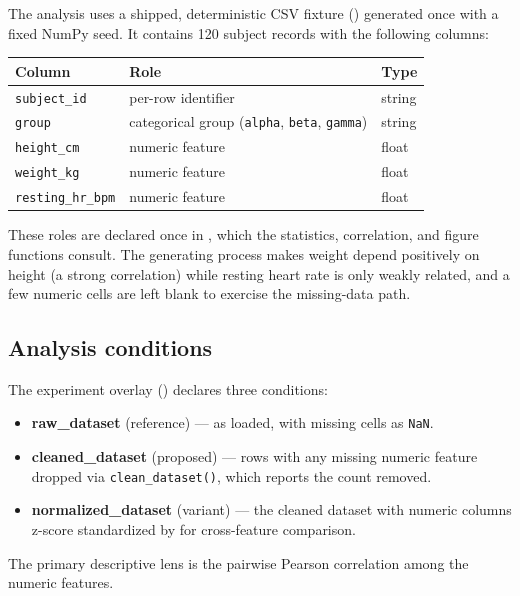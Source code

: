 \documentclass[
  english,
]{article}
\newcounter{none} %
\providecommand{\tightlist}{%
  \setlength{\itemsep}{0pt}\setlength{\parskip}{0pt}}
\begin{document}
The analysis uses a shipped, deterministic CSV fixture
() generated once with a fixed NumPy seed.
It contains 120 subject records with the following columns:

{\def\LTcaptype{none} %
\begin{longtable}[]{@{}lll@{}}
\toprule\noalign{}
Column & Role & Type \\
\midrule\noalign{}
\endhead
\bottomrule\noalign{}
\endlastfoot
\texttt{subject\_id} & per-row identifier & string \\
\texttt{group} & categorical group (\texttt{alpha}, \texttt{beta},
\texttt{gamma}) & string \\
\texttt{height\_cm} & numeric feature & float \\
\texttt{weight\_kg} & numeric feature & float \\
\texttt{resting\_hr\_bpm} & numeric feature & float \\
\end{longtable}
}

These roles are declared once in
, which the statistics,
correlation, and figure functions consult. The generating process makes
weight depend positively on height (a strong correlation) while resting
heart rate is only weakly related, and a few numeric cells are left
blank to exercise the missing-data path.

\subsection{Analysis conditions}\label{analysis-conditions}

The experiment overlay () declares three
conditions:

\begin{itemize}
\tightlist
\item
  \textbf{raw\_dataset} (reference) --- as loaded, with missing cells as
  \texttt{NaN}.
\item
  \textbf{cleaned\_dataset} (proposed) --- rows with any missing numeric
  feature dropped via \texttt{clean\_dataset()}, which reports the count
  removed.
\item
  \textbf{normalized\_dataset} (variant) --- the cleaned dataset with
  numeric columns z-score standardized by 
  for cross-feature comparison.
\end{itemize}

The primary descriptive lens is the pairwise Pearson correlation among
the numeric features.
\end{document}
